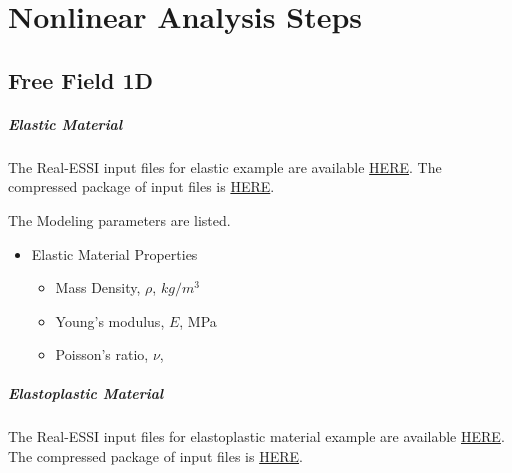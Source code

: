 \chapter{Nonlinear Analysis Steps}
\label{ch-nonlinear-analysis-steps}





\clearpage
\newpage
\section{Free Field 1D}
\label{free_field_1D}
\paragraph{Elastic Material}
The Real-ESSI input files for elastic example are available 
\href{https://github.com/yuan-energy/Real-ESSI-Short-Course-Examples/tree/master/short-course-examples/nonlinear_analysis_steps/free_field_1D/elastic}{HERE}. 
The compressed package of input files is  
\href{https://github.com/yuan-energy/Real-ESSI-Short-Course-Examples/tree/master/short-course-examples/nonlinear_analysis_steps/free_field_1D/elastic/elastic.tgz?raw=true}{HERE}. 


The Modeling parameters are listed.
\begin{itemize}
  \item Elastic Material Properties 
  \begin{itemize}
    \item Mass Density, $\rho$, \enspace {} $kg/m^3$
    \item Young's modulus, $E$, \enspace {} MPa
    \item Poisson's ratio, $\nu$, \enspace {}
  \end{itemize}
\end{itemize}





\paragraph{Elastoplastic Material}
The Real-ESSI input files for elastoplastic material example are available 
\href{https://github.com/yuan-energy/Real-ESSI-Short-Course-Examples/tree/master/short-course-examples/nonlinear_analysis_steps/free_field_1D/elastoplastic}{HERE}. 
The compressed package of input files is  
\href{https://github.com/yuan-energy/Real-ESSI-Short-Course-Examples/tree/master/short-course-examples/nonlinear_analysis_steps/free_field_1D/elastoplastic/elastoplastic.tgz?raw=true}{HERE}. 

